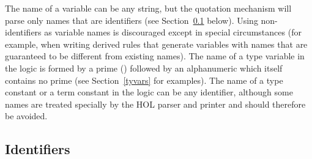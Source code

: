  The name
of a \HOL{} variable
%
%
can be any \ML{} string, but the quotation mechanism will parse only
names that are identifiers (see Section~\ref{ident} below).  Using non-identifiers as variable names is discouraged except in special
circumstances (for example, when writing derived rules that generate
variables with names that are guaranteed to be different from existing
names). The name of a type variable
%
%
in the \HOL{} logic is formed by a prime () followed by an
alphanumeric which itself contains no prime (see Section~\ref{tyvars}
for examples).  The name of a type constant or a term constant in the
\HOL{} logic can be any identifier, although some names are treated
specially by the HOL parser and printer and should therefore be
avoided.
%

\subsection{Identifiers}\label{ident}


